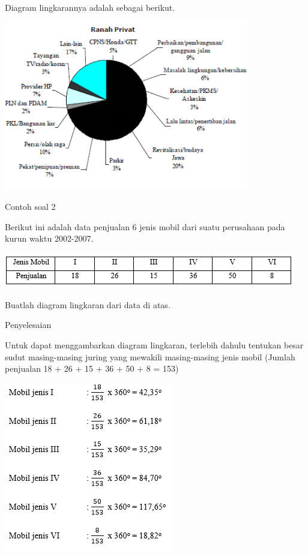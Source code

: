 \documentclass[11pt,fleqn]{book} %
\begin{document}
{Diagram lingkarannya adalah sebagai berikut.

\includegraphics[width = 10.78cm, height= 7.41cm]{Pictures/Gb9_diana.png}

Contoh soal 2


Berikut ini adalah data penjualan 6 jenis mobil dari suatu perusahaan pada kurun waktu 2002-2007.


\includegraphics[width = 12.75cm, height= 1.54cm]{Pictures/Gb10_diana.png}


Buatlah diagram lingkaran dari data di atas.

Penyelesaian

Untuk dapat menggambarkan diagram lingkaran, terlebih dahulu tentukan besar sudut masing-masing juring yang mewakili masing-masing jenis mobil (Jumlah penjualan 18 + 26 + 15 + 36 + 50 + 8 = 153)

\includegraphics[width = 7.33cm, height= 7.46cm]{Pictures/Gb11_diana.png}


}
\end{document}
